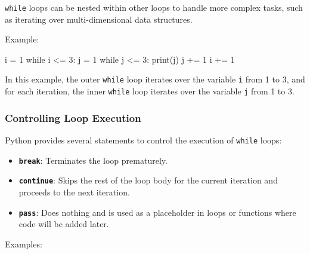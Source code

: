 \documentclass[
  letterpaper,
  DIV=11,
  numbers=noendperiod]{scrreprt}
\newenvironment{Shaded}{\begin{snugshade}}{\end{snugshade}}
\newcommand{\BuiltInTok}[1]{\textcolor[rgb]{0.00,0.23,0.31}{#1}}
\newcommand{\ControlFlowTok}[1]{\textcolor[rgb]{0.00,0.23,0.31}{#1}}
\newcommand{\DecValTok}[1]{\textcolor[rgb]{0.68,0.00,0.00}{#1}}
\newcommand{\NormalTok}[1]{\textcolor[rgb]{0.00,0.23,0.31}{#1}}
\newcommand{\OperatorTok}[1]{\textcolor[rgb]{0.37,0.37,0.37}{#1}}
\providecommand{\tightlist}{%
  \setlength{\itemsep}{0pt}\setlength{\parskip}{0pt}}\usepackage{longtable,booktabs,array}
\begin{document}
\texttt{while} loops can be nested within other loops to handle more
complex tasks, such as iterating over multi-dimensional data structures.

Example:

\begin{Shaded}
\begin{Highlighting}[]
\NormalTok{i }\OperatorTok{=} \DecValTok{1}
\ControlFlowTok{while}\NormalTok{ i }\OperatorTok{\textless{}=} \DecValTok{3}\NormalTok{:}
\NormalTok{    j }\OperatorTok{=} \DecValTok{1}
    \ControlFlowTok{while}\NormalTok{ j }\OperatorTok{\textless{}=} \DecValTok{3}\NormalTok{:}
        \BuiltInTok{print}\NormalTok{(j)}
\NormalTok{        j }\OperatorTok{+=} \DecValTok{1}
\NormalTok{    i }\OperatorTok{+=} \DecValTok{1}
\end{Highlighting}
\end{Shaded}

In this example, the outer \texttt{while} loop iterates over the
variable \texttt{i} from 1 to 3, and for each iteration, the inner
\texttt{while} loop iterates over the variable \texttt{j} from 1 to 3.

\hypertarget{controlling-loop-execution}{%
\subsubsection{Controlling Loop
Execution}\label{controlling-loop-execution}}

Python provides several statements to control the execution of
\texttt{while} loops:

\begin{itemize}
\tightlist
\item
  \textbf{\texttt{break}}: Terminates the loop prematurely.
\item
  \textbf{\texttt{continue}}: Skips the rest of the loop body for the
  current iteration and proceeds to the next iteration.
\item
  \textbf{\texttt{pass}}: Does nothing and is used as a placeholder in
  loops or functions where code will be added later.
\end{itemize}

Examples:
\end{document}
